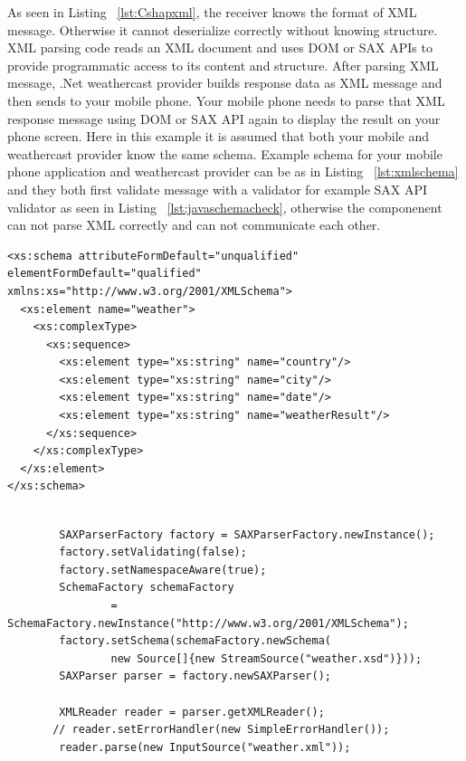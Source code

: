 As seen in Listing ~\ref{lst:Cshapxml}, the receiver knows the format of XML message. Otherwise it cannot deserialize correctly without knowing structure. XML parsing code reads an XML document and uses DOM or SAX APIs to provide programmatic access to its content and structure. After parsing XML message, .Net weathercast provider builds response data as XML message and then sends to your mobile phone. Your mobile phone needs to parse that XML response message using DOM or SAX API again to display the result on your phone screen. Here in this example it is assumed that both your mobile and weathercast provider know the same schema. Example schema for your mobile phone application and weathercast provider can be as in Listing ~\ref{lst:xmlschema}  and they both first validate message with a validator for example  SAX API validator\citep{thesis:arch10} as seen in Listing ~\ref{lst:javaschemacheck}, otherwise the componenent can not parse XML correctly and can not communicate each other.

\begin{lstlisting}[caption=Example schema for Weather XML file, label=lst:xmlschema]
<xs:schema attributeFormDefault="unqualified" elementFormDefault="qualified" xmlns:xs="http://www.w3.org/2001/XMLSchema">
  <xs:element name="weather">
    <xs:complexType>
      <xs:sequence>
        <xs:element type="xs:string" name="country"/>
        <xs:element type="xs:string" name="city"/>
        <xs:element type="xs:string" name="date"/>
        <xs:element type="xs:string" name="weatherResult"/>
      </xs:sequence>
    </xs:complexType>
  </xs:element>
</xs:schema>
\end{lstlisting}


\begin{lstlisting}[caption=Example XML message to send weathercast provider, label=lst:javaschemacheck]

		SAXParserFactory factory = SAXParserFactory.newInstance();
        factory.setValidating(false);
        factory.setNamespaceAware(true);
        SchemaFactory schemaFactory
                = SchemaFactory.newInstance("http://www.w3.org/2001/XMLSchema");
        factory.setSchema(schemaFactory.newSchema(
                new Source[]{new StreamSource("weather.xsd")}));
        SAXParser parser = factory.newSAXParser();

        XMLReader reader = parser.getXMLReader();
       // reader.setErrorHandler(new SimpleErrorHandler());
        reader.parse(new InputSource("weather.xml"));

\end{lstlisting}

